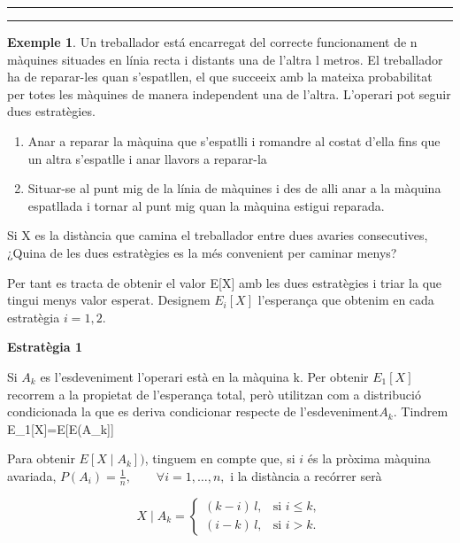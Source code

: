\documentclass[
  catalan,
]{article}
\theoremstyle{definition}
\theoremstyle{definition}
\newtheorem{example}{Exemple}[section]
\theoremstyle{definition}
\theoremstyle{definition}
\theoremstyle{remark}
\begin{document}
\begin{center}\rule{0.5\linewidth}{0.5pt}\end{center}

\begin{center}\rule{0.5\linewidth}{0.5pt}\end{center}

\begin{example}
Un treballador está encarregat del correcte funcionament de n màquines situades en línia recta i distants una de l'altra l metros. El treballador ha de reparar-les quan s'espatllen, el que succeeix amb la mateixa probabilitat per totes les màquines de manera independent una de l'altra. L'operari pot seguir dues estratègies.

\begin{enumerate}
\def\labelenumi{\arabic{enumi}.}
\item
  Anar a reparar la màquina que s'espatlli i romandre al costat d'ella fins que un altra s'espatlle i anar llavors a reparar-la
\item
  Situar-se al punt mig de la línia de màquines i des de alli anar a la màquina espatllada i tornar al punt mig quan la màquina estigui reparada.
\end{enumerate}

Si X es la distància que camina el treballador entre dues avaries consecutives, ¿Quina de les dues estratègies es la més convenient per caminar menys?

Per tant es tracta de obtenir el valor E{[}X{]} amb les dues estratègies i triar la que tingui menys valor esperat. Designem \(E_i[X]\) l'esperança que obtenim en cada estratègia \(i=1,2\).

\textbf{Estratègia 1}

Si \(A_k\) es l'esdeveniment l'operari està en la màquina k. Per obtenir \(E_1[X]\) recorrem a la propietat de l'esperança total, però utilitzan com a distribució condicionada la que es deriva condicionar respecte de l'esdeveniment\(A_k\). Tindrem E\_1{[}X{]}=E{[}E(A\_k{]}{]}

Para obtenir \(E[X\mid A_k])\), tinguem en compte que, si \(i\) és la pròxima màquina avariada, \(P(A_i)=\frac{1}{n}, \qquad \forall i=1,\ldots,n,\) i la distància a recórrer serà

\[
X\mid A_k=
\begin{cases}
(k-i)\,l, & \text{si } i\le k,\\[1ex]
(i-k)\,l, & \text{si } i>k.
\end{cases}
\]


\end{example}
\end{document}
